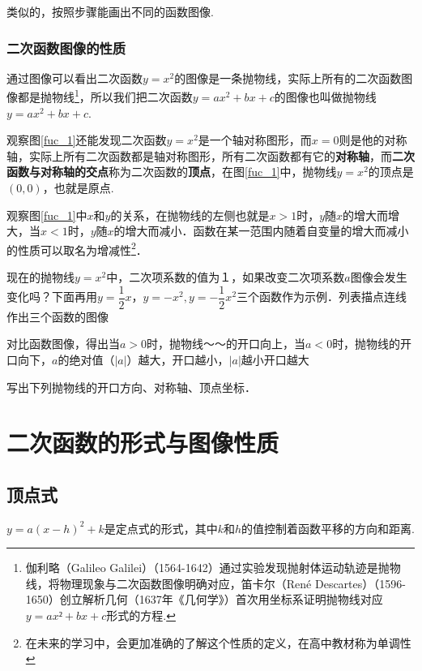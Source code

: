 \documentclass[lang=cn, 10pt, titlestyle=display, oneside, toc=twocol]{elegantbook}
\begin{document}
类似的，按照步骤能画出不同的函数图像.
\par
\subsubsection{二次函数图像的性质}
通过图像可以看出二次函数\(y=x^2\)的图像是一条抛物线，实际上所有的二次函数图像都是抛物线\footnote{伽利略（Galileo Galilei）（1564-1642）通过实验发现抛射体运动轨迹是抛物线，将物理现象与二次函数图像明确对应，笛卡尔（René Descartes）（1596-1650）创立解析几何（1637年《几何学》）首次用坐标系证明抛物线对应\(y=ax²+bx+c\)形式的方程.}，所以我们把二次函数\(y=ax^2+bx+c\)的图像也叫做抛物线\(y=ax^2+bx+c\).
\par
观察图\ref{fuc_1}还能发现二次函数\(y=x^2\)是一个轴对称图形，而\(x=0\)则是他的对称轴，实际上所有二次函数都是轴对称图形，所有二次函数都有它的\textbf{对称轴}，而\textbf{二次函数与对称轴的交点}称为二次函数的\textbf{顶点}，在图\ref{fuc_1}中，抛物线\(y=x^2\)的顶点是\((0,0)\)，也就是原点.
\par
观察图\ref{fuc_1}中\(x\)和\(y\)的关系，在抛物线的左侧也就是\(x>1\)时，\(y\)随\(x\)的增大而增大，当\(x<1\)时，\(y\)随\(x\)的增大而减小．函数在某一范围内随着自变量的增大而减小的性质可以取名为增减性\footnote{在未来的学习中，会更加准确的了解这个性质的定义，在高中教材称为单调性}．
\par
现在的抛物线$y=x^2$中，二次项系数的值为１，如果改变二次项系数$a$图像会发生变化吗？下面再用\(y=\dfrac{1}{2}x，y=-x^2, y=-\dfrac{1}{2}x^2\)三个函数作为示例．列表描点连线作出三个函数的图像
\par
对比函数图像，得出当\(a>0\)时，抛物线～～的开口向上，当$a<0$时，抛物线的开口向下，\(a\)的绝对值（$|a|$）越大，开口越小，$|a|$越小开口越大

\begin{example}
    写出下列抛物线的开口方向、对称轴、顶点坐标．
\end{example}

\section{二次函数的形式与图像性质}

\subsection{顶点式}

\(y=a(x-h)^2+k\)是定点式的形式，其中\(k\)和\(h\)的值控制着函数平移的方向和距离.
\end{document}

